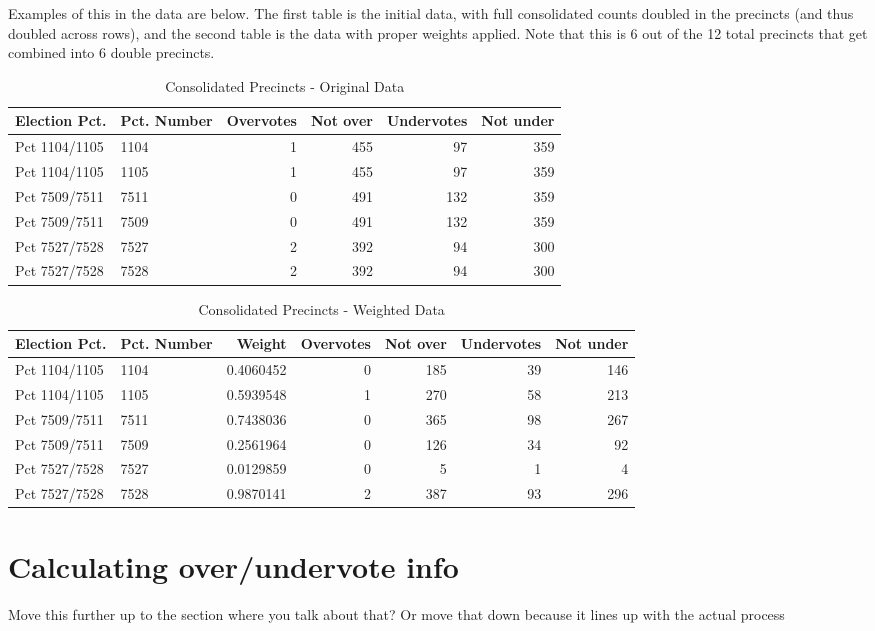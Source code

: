 \documentclass[12pt,twoside]{reedthesis}
\theoremstyle{definition}
\theoremstyle{definition}
\theoremstyle{definition}
\theoremstyle{remark}
\begin{document}
Examples of this in the data are below. The first table is the initial
data, with full consolidated counts doubled in the precincts (and thus
doubled across rows), and the second table is the data with proper
weights applied. Note that this is 6 out of the 12 total precincts that
get combined into 6 double precincts.
\begin{longtable}[t]{llrrrr}
\caption[Combined Precincts - Original]{\label{tab:unnamed-chunk-9}Consolidated Precincts - Original Data}\\
\toprule
Election Pct. & Pct. Number & Overvotes & Not over & Undervotes & Not under\\
\midrule
Pct 1104/1105 & 1104 & 1 & 455 & 97 & 359\\
Pct 1104/1105 & 1105 & 1 & 455 & 97 & 359\\
Pct 7509/7511 & 7511 & 0 & 491 & 132 & 359\\
Pct 7509/7511 & 7509 & 0 & 491 & 132 & 359\\
Pct 7527/7528 & 7527 & 2 & 392 & 94 & 300\\
Pct 7527/7528 & 7528 & 2 & 392 & 94 & 300\\
\bottomrule
\end{longtable}
\begin{longtable}[t]{llrrrrr}
\caption[Combined Precincts - Weighted]{\label{tab:unnamed-chunk-10}Consolidated Precincts - Weighted Data}\\
\toprule
Election Pct. & Pct. Number & Weight & Overvotes & Not over & Undervotes & Not under\\
\midrule
Pct 1104/1105 & 1104 & 0.4060452 & 0 & 185 & 39 & 146\\
Pct 1104/1105 & 1105 & 0.5939548 & 1 & 270 & 58 & 213\\
Pct 7509/7511 & 7511 & 0.7438036 & 0 & 365 & 98 & 267\\
Pct 7509/7511 & 7509 & 0.2561964 & 0 & 126 & 34 & 92\\
Pct 7527/7528 & 7527 & 0.0129859 & 0 & 5 & 1 & 4\\
Pct 7527/7528 & 7528 & 0.9870141 & 2 & 387 & 93 & 296\\
\bottomrule
\end{longtable}
\hypertarget{calculating-overundervote-info}{%
\section{Calculating over/undervote
info}\label{calculating-overundervote-info}}

Move this further up to the section where you talk about that? Or move
that down because it lines up with the actual process
\end{document}
